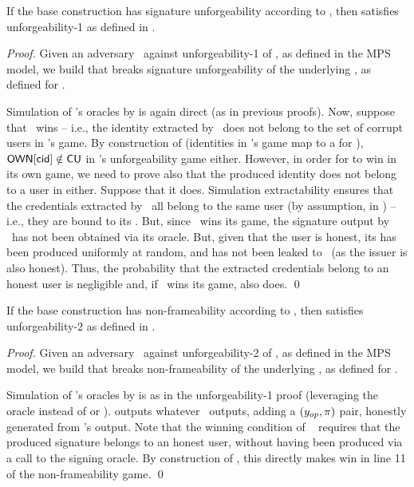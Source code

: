 \begin{theorem}
  If the base \CUASGen construction has signature unforgeability according to
  , then \CUASMPS satisfies unforgeability-1 as
  defined in \cite{ngsy22}.
\end{theorem}

\begin{proof}
  Given an adversary \adv~against unforgeability-1 of \CUASMPS, as defined in
  the MPS model, we build \advB that breaks signature unforgeability of the
  underlying \CUASGen, as defined for \UAS.

  Simulation of \adv's oracles by \advB is again direct (as in previous proofs).
  Now, suppose that \adv~wins -- i.e., the identity extracted by \adv~does not
  belong to the set of corrupt users in \adv's game. By construction of \advB
  (identities in \adv's game map to a \cid for \advB), $\mathsf{OWN}[\mathsf{cid}] \notin
  \mathsf{CU}$ in \advB's unforgeability game either.
  However, in order for \advB to win in its own game, we need to prove also that
  the produced identity does not belong to a user in \HU either. Suppose that it
  does. Simulation extractability ensures that the credentials extracted by
  \adv~all belong to the same user (by assumption, in \HU) -- i.e., they are
  bound to its \usk. But, since \adv~wins its game, the signature output by
  \adv~has not been obtained via its \SIGN oracle. But, given that the user is
  honest, its \usk has been produced uniformly at random, and has not been
  leaked to \adv~(as the issuer is also honest). Thus, the probability that
  the extracted credentials belong to an honest user is negligible and, if
  \adv~wins its game, \advB also does.
  \qed
\end{proof}

\begin{theorem}
  If the base \CUASGen construction has non-frameability according to
  , then \CUASMPS satisfies unforgeability-2 as
  defined in \cite{ngsy22}.
\end{theorem}

\begin{proof}
  Given an adversary \adv~against unforgeability-2 of \CUASMPS, as defined in
  the MPS model, we build \advB that breaks non-frameability of the underlying
  \CUASGen, as defined for \UAS.

  Simulation of \adv's oracles by \advB is as in the unforgeability-1 proof
  (leveraging the \OBTAIN oracle instead of \OBTISS or \ISSUE).
  \advB outputs whatever \adv~outputs, adding a $(y_{op},\pi)$ pair, honestly
  generated from \adv's output. Note that the winning condition of \adv~
  requires that the produced signature belongs to an honest user, without
  having been produced via a call to the signing oracle. By construction of
  \advB, this directly makes \advB win in line 11 of the non-frameability game.
  \qed
\end{proof}

